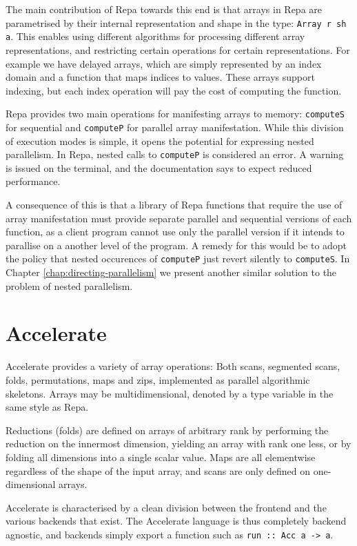 The main contribution of Repa towards this end is that arrays in Repa are
parametrised by their internal representation and shape in the type:
\lstinline{Array r sh a}.  This enables using different algorithms for processing
different array representations, and restricting certain operations for certain
representations. For example we have delayed arrays, which are simply
represented by an index domain and a function that maps indices to values.
These arrays support indexing, but each index operation will pay the cost of
computing the function.

Repa provides two main operations for manifesting arrays to memory:
\lstinline{computeS} for sequential and \lstinline{computeP} for parallel array
manifestation. While this division of execution modes is simple, it opens the
potential for expressing nested parallelism. In Repa, nested calls to
\lstinline{computeP} is considered an error. A warning is issued on the terminal,
and the documentation says to expect reduced performance.

A consequence of this is that a library of Repa functions that require the use
of array manifestation must provide separate parallel and sequential versions
of each function, as a client program cannot use only the parallel version if
it intends to parallise on a another level of the program.  A remedy for this
would be to adopt the policy that nested occurences of \lstinline{computeP} just
revert silently to \lstinline{computeS}. In Chapter
\ref{chap:directing-parallelism} we present another similar solution to the
problem of nested parallelism.

\section{Accelerate}
\label{sec:language-discussion-accelerate}
Accelerate provides a variety of array operations: Both scans,
segmented scans, folds, permutations, maps and zips, implemented as
parallel algorithmic skeletons. Arrays may be multidimensional,
denoted by a type variable in the same style as Repa.

Reductions (folds) are defined on arrays of arbitrary rank by
performing the reduction on the innermost dimension, yielding an array
with rank one less, or by folding all dimensions into a single scalar
value.  Maps are all elementwise regardless of the shape of the input
array, and scans are only defined on one-dimensional arrays.

Accelerate is characterised by a clean division between the frontend and the
various backends that exist. The Accelerate language is thus completely backend
agnostic, and backends simply export a function such as \hbox{\lstinline{run :: Acc a -> a}.}

